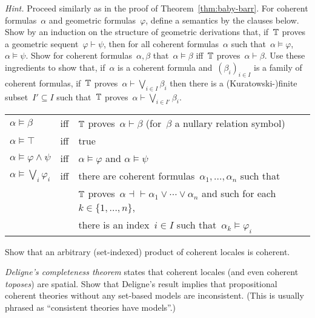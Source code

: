 \documentclass{ws-rv9x6}
\begin{document}
{\begin{exercise}
\begin{alphlist}[(d)]
{\scriptsize\emph{Hint.} Proceed similarly as in the proof of
Theorem~\ref{thm:baby-barr}. For coherent formulas~$\alpha$ and geometric
formulas~$\varphi$, define a semantics by the clauses below. Show by an induction on the
structure of geometric derivations that, if~$\mathbb{T}$ proves a geometric
sequent~$\varphi \vdash \psi$, then for all coherent formulas~$\alpha$ such
that~$\alpha \models \varphi$, $\alpha \models \psi$. Show for coherent
formulas~$\alpha,\beta$ that~$\alpha \models \beta$ iff~$\mathbb{T}$ proves~$\alpha
\vdash \beta$. Use these ingredients to show that, if~$\alpha$ is a coherent
formula and~$(\beta_i)_{i \in I}$ is a family of coherent formulas, if~$\mathbb{T}$
proves~$\alpha \vdash \bigvee_{i \in I} \beta_i$ then there is a
(Kuratowski-)finite subset~$I' \subseteq I$ such that~$\mathbb{T}$ proves~$\alpha
\vdash \bigvee_{i \in I'} \beta_i$.

\begin{center}\tablefont
\begin{tabular}{@{}l@{\ \ }c@{\ \ }l@{}}
  $\alpha \models \beta$ &iff& $\mathbb{T}$ proves~$\alpha \vdash \beta$ \qquad(for~$\beta$ a nullary relation symbol) \\
  $\alpha \models \top$ &iff& true \\
  $\alpha \models \varphi \wedge \psi$ &iff& $\alpha \models \varphi$ and $\alpha \models \psi$ \\
  $\alpha \models \bigvee_i \varphi_i$ &iff& there are coherent
  formulas~$\alpha_1,\ldots,\alpha_n$ such that \\ &&\qquad $\mathbb{T}$ proves~$\alpha \dashv\vdash
  \alpha_1 \vee \cdots \vee \alpha_n$ and such for each~$k \in \{1,\ldots,n\}$,
  \\ &&\qquad\qquad there is an index~$i \in I$ such that~$\alpha_k \models \varphi_i$
\end{tabular}
\end{center}}

\item Show that an arbitrary (set-indexed) product of coherent locales is
coherent.

\item \emph{Deligne's completeness theorem} states that coherent locales (and
even coherent \emph{toposes}) are spatial. Show that Deligne's
result implies that propositional coherent theories
without any set-based models are inconsistent. (This is usually phrased as
``consistent theories have models''.)
\end{alphlist}
\end{exercise}

}
\end{document}
